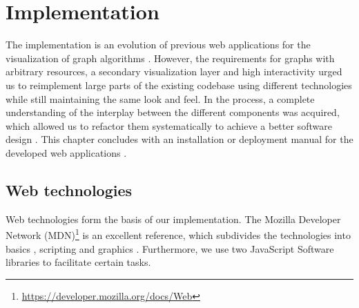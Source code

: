 \chapter{Implementation}\label{ch:5}

\newenvironment{ssfont}{\fontfamily{lmss}\selectfont}{\par}

The implementation is an evolution of previous web applications for the visualization of graph algorithms \cite{storz2013idp,velden2014idp,sefidgar2015idp,becker2015idp,zoennchen2015idp}. However, the requirements for graphs with arbitrary resources, a secondary visualization layer and high interactivity urged us to reimplement large parts of the existing codebase using different technologies  while still maintaining the same look and feel. In the process, a complete understanding of the interplay between the different components was acquired, which allowed us to refactor them systematically to achieve a better software design . This chapter concludes with an installation or deployment manual for the developed web applications .

\section{Web technologies}\label{sec:technologies}
Web technologies form the basis of our implementation. The Mozilla Developer Network (MDN)\footnote{\url{https://developer.mozilla.org/docs/Web}} is an excellent reference, which subdivides the technologies into basics , scripting  and graphics . Furthermore, we use two JavaScript Software libraries  to facilitate certain tasks.

